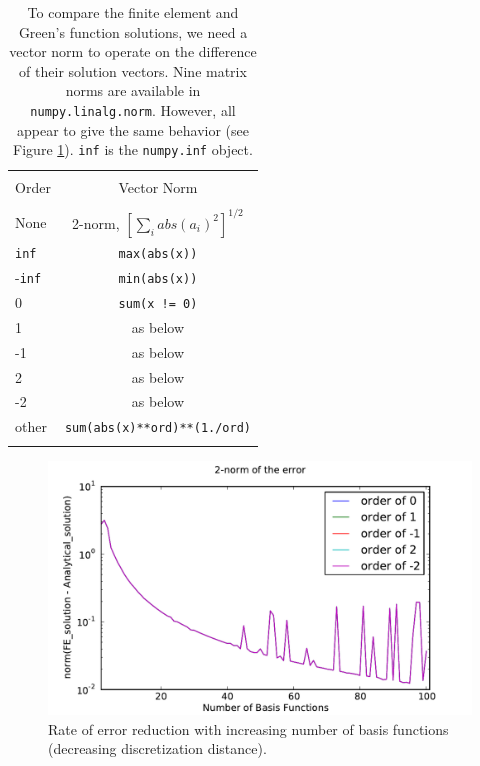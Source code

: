 \documentclass[10pt]{article}
\begin{document}
\begin{table}
    \centering
    \label{table:norms}
    \begin{tabular}{lc}
        \hline \\
        Order  & Vector Norm \\
        \hline \\
        None   & 2-norm, $[\sum_{i} abs(a_{i})^2]^{1/2}$ \\
        \texttt{inf}    &  \texttt{max(abs(x))} \\
        -\texttt{inf}   &  \texttt{min(abs(x))} \\
        0      &  \texttt{sum(x != 0)} \\
        1      &  as below \\
        -1     &  as below \\
        2      &  as below \\
        -2     &  as below \\
        other  & \texttt{sum(abs(x)**ord)**(1./ord)} \\
        \hline \\
    \end{tabular} 
    \caption{To compare the finite element and Green's function solutions, we need a vector norm to operate on the difference of their solution vectors. Nine matrix norms are available in \texttt{numpy.linalg.norm}. However, all appear to give the same behavior (see Figure \ref{fig:errorrate}). \texttt{inf} is the \texttt{numpy.inf} object.}
\end{table}

\begin{figure}[ht]
    \centering
    \includegraphics[width=\columnwidth,keepaspectratio=true]{./hw7-error_rate-mult_orders.pdf}
    \caption{Rate of error reduction with increasing number of basis functions (decreasing discretization distance).}
    \label{fig:errorrate}
\end{figure}
\end{document}
